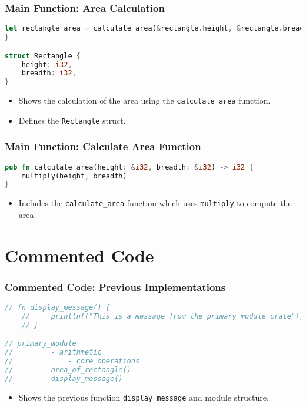 \documentclass[aspectratio=169, table]{beamer}
\begin{document}
\begin{frame}[fragile]
\frametitle{Main Function: Area Calculation}
\begin{lstlisting}[language=Rust]
	let rectangle_area = calculate_area(&rectangle.height, &rectangle.breadth);
}

struct Rectangle {
	height: i32,
	breadth: i32,
}
\end{lstlisting}
\begin{itemize}
\item Shows the calculation of the area using the \texttt{calculate\_area} function.
\item Defines the \texttt{Rectangle} struct.
\end{itemize}
\end{frame}

\begin{frame}[fragile]
\frametitle{Main Function: Calculate Area Function}
\begin{lstlisting}[language=Rust]
pub fn calculate_area(height: &i32, breadth: &i32) -> i32 {
	multiply(height, breadth)
}
\end{lstlisting}
\begin{itemize}
\item Includes the \texttt{calculate\_area} function which uses \texttt{multiply} to compute the area.
\end{itemize}
\end{frame}


\section{Commented Code}

\begin{frame}[fragile]
\frametitle{Commented Code: Previous Implementations}
\begin{lstlisting}[language=Rust]
// fn display_message() {
	//     println!("This is a message from the primary_module crate");
	// }

// primary_module
//         - arithmetic
//             - core_operations
//         area_of_rectangle()
//         display_message()
\end{lstlisting}
\begin{itemize}
\item Shows the previous function \texttt{display\_message} and module structure.
\end{itemize}
\end{frame}
\end{document}
